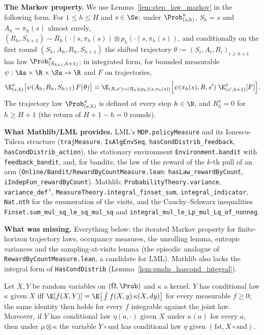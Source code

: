 \textbf{The Markov property.} We use Lemma~\ref{lem:step_law_markov} in the following form.
For $1 \le h \le H$ and $s \in \Ss$: under $\Prob^\pi_{(s,h)}$, $S_h = s$ and $A_h = \pi_h(s)$
almost surely, $(R_h, S_{h+1}) \sim R_h(\cdot \mid s, \pi_h(s)) \otimes p_h(\cdot \mid s, \pi_h(s))$,
and conditionally on the first round $(S_h, A_h, R_h, S_{h+1})$ the shifted trajectory
$\theta := (S_i, A_i, R_i)_{i \ge h+1}$ has law $\Prob^\pi_{(S_{h+1}, h+1)}$; in integrated
form, for bounded measurable $\psi : \As \times \R \times \Ss \to \R$ and $F$ on trajectories,
\begin{equation}\label{eq:pmdp_markov_integrated}
  \E^\pi_{(s,h)}\big[\psi(A_h, R_h, S_{h+1})\, F(\theta)\big]
  = \E_{(R, s') \sim (R_h \otimes p_h)(s, \pi_h(s))}\Big[\psi(\pi_h(s), R, s')\;\E^\pi_{(s',h+1)}[F]\Big] .
\end{equation}
The trajectory law $\Prob^\pi_{(s, h)}$ is defined at every step $h \in \N$, and $R^\pi_h = 0$
for $h \ge H + 1$ (the return of $H + 1 - h = 0$ rounds).

\textbf{What Mathlib/LML provides.} LML's \texttt{MDP.policyMeasure} and its Ionescu-Tulcea
structure (\texttt{trajMeasure}, \texttt{IsAlgEnvSeq}, \texttt{hasCondDistrib\_feedback},
\texttt{hasCondDistrib\_action}), the stationary environment \texttt{Environment.bandit} with
\texttt{feedback\_bandit}, and, for bandits, the law of the reward of the $k$-th pull
of an arm (\texttt{Online/Bandit/RewardByCountMeasure.lean}: \texttt{hasLaw\_rewardByCount},
\texttt{iIndepFun\_rewardByCount}). Mathlib: \texttt{ProbabilityTheory.variance},
\texttt{variance\_def'}, \texttt{MeasureTheory.integral\_finset\_sum},
\texttt{integral\_indicator}, \texttt{Nat.nth} for the enumeration of the visits, and the
Cauchy--Schwarz inequalities \texttt{Finset.sum\_mul\_sq\_le\_sq\_mul\_sq} and
\texttt{integral\_mul\_le\_Lp\_mul\_Lq\_of\_nonneg}.

\textbf{What was missing.} Everything below: the iterated Markov property for finite-horizon
trajectory laws, occupancy measures, the unrolling lemma, entropic variances and the
sampling-at-visits lemma (the episodic analogue of \texttt{RewardByCountMeasure.lean}, a
candidate for LML). Mathlib also lacks the integral form of \texttt{HasCondDistrib}
(Lemma~\ref{lem:pmdp_hascond_integral}).

\begin{lemma}\label{lem:pmdp_hascond_integral}
\leanok
Let $X, Y$ be random variables on $(\Omega, \Prob)$ and $\kappa$ a kernel. $Y$ has conditional law
$\kappa$ given $X$ iff $\E[f(X, Y)] = \E\big[\int f(X, y)\,\kappa(X, dy)\big]$ for every measurable
$f \ge 0$; the same identity then holds for every $f$ integrable against the joint law. Moreover,
if $Y$ has conditional law $\eta(a, \cdot)$ given $X$ under $\kappa(a)$ for every $a$, then under
$\mu \otimes \kappa$ the variable $Y \circ \mathrm{snd}$ has conditional law $\eta$ given
$(\mathrm{fst}, X \circ \mathrm{snd})$.
\end{lemma}

